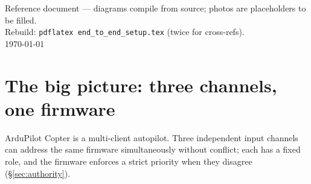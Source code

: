 \documentclass[11pt,a4paper]{article}
\begin{document}
\vfill
\begin{center}
\small Reference document --- diagrams compile from source; photos are placeholders to be filled.\\
Rebuild: \texttt{pdflatex end\_to\_end\_setup.tex} (twice for cross-refs).\\
\today
\end{center}

\newpage

\tableofcontents
\newpage

\section{The big picture: three channels, one firmware}

ArduPilot Copter is a multi-client autopilot. Three independent input
channels can address the same firmware simultaneously without conflict;
each has a fixed role, and the firmware enforces a strict priority
when they disagree (\S\ref{sec:authority}).
\end{document}
